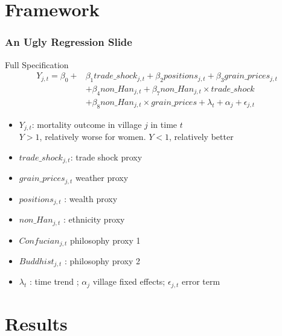 \section{Framework}

\begin{frame}
\frametitle{An Ugly Regression Slide}
\begin{block}{Full Specification}
\begin{equation}
\begin{split}
Y_{j,t} = \beta_0 + & \beta_1 trade\_shock_{j,t} + \beta_2 positions_{j,t} + \beta_3 grain\_prices_{j,t} 
\\ & + \beta_4 non\_Han_{j,t} + \beta_7 non\_Han_{j,t} \times trade\_shock
\\ & + \beta_8 non\_Han_{j,t} \times grain\_prices + \lambda_t + \alpha_j + \epsilon_{j,t}
\end{split}
\end{equation} 
\end{block}
{\tiny
\begin{itemize}
\item $Y_{j,t}$: mortality outcome in village $j$ in time $t$\\
{\tiny $Y>1$, relatively worse for women. $Y<1$, relatively better}
\item $trade\_shock_{j,t} $: trade shock proxy
\item $grain\_prices_{j,t}$ weather proxy
\item $positions_{j,t}$ : wealth proxy
\item $non\_Han_{j,t}$ : ethnicity proxy
\item $Confucian_{j,t}$ philosophy proxy 1
\item $Buddhist_{j,t}$ : philosophy proxy 2
\item $\lambda_t$ : time trend ; $\alpha_j$ village fixed effects; $\epsilon_{j,t}$ error term 
\end{itemize}}

\end{frame}


\section{Results}



